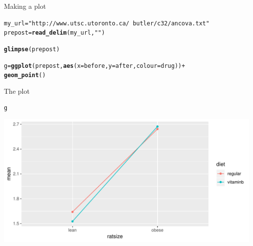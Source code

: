 \documentclass[unknownkeysallowed]{beamer}\usepackage[]{graphicx}\usepackage[]{color}
\makeatletter
\def\maxwidth{ %
  \ifdim\Gin@nat@width>\linewidth
    \linewidth
  \else
    \Gin@nat@width
  \fi
}
\newcommand{\hlstr}[1]{\textcolor[rgb]{0.192,0.494,0.8}{#1}}%
\newcommand{\hlopt}[1]{\textcolor[rgb]{0,0,0}{#1}}%
\newcommand{\hlstd}[1]{\textcolor[rgb]{0.345,0.345,0.345}{#1}}%
\newcommand{\hlkwb}[1]{\textcolor[rgb]{0.69,0.353,0.396}{#1}}%
\newcommand{\hlkwc}[1]{\textcolor[rgb]{0.333,0.667,0.333}{#1}}%
\newcommand{\hlkwd}[1]{\textcolor[rgb]{0.737,0.353,0.396}{\textbf{#1}}}%
\newenvironment{kframe}{%
 \def\at@end@of@kframe{}%
 \ifinner\ifhmode%
  \def\at@end@of@kframe{\end{minipage}}%
  \begin{minipage}{\columnwidth}%
 \fi\fi%
 \def\FrameCommand##1{\hskip\@totalleftmargin \hskip-\fboxsep
 \colorbox{shadecolor}{##1}\hskip-\fboxsep
     \hskip-\linewidth \hskip-\@totalleftmargin \hskip\columnwidth}%
 \MakeFramed {\advance\hsize-\width
   \@totalleftmargin\z@ \linewidth\hsize
   \@setminipage}}%
 {\par\unskip\endMakeFramed%
 \at@end@of@kframe}
\newenvironment{knitrout}{}{} %
\makeatother
\begin{document}
\begin{frame}[fragile]{Making a plot}

 
\begin{knitrout}\small
{}\color{fgcolor}\begin{kframe}
\begin{alltt}
\hlstd{my_url}\hlkwb{=}\hlstr{"http://www.utsc.utoronto.ca/~butler/c32/ancova.txt"}
\hlstd{prepost}\hlkwb{=}\hlkwd{read_delim}\hlstd{(my_url,}\hlstr{" "}\hlstd{)}
\end{alltt}


{\ttfamily\noindent\bfseries{}}\begin{alltt}
\hlkwd{glimpse}\hlstd{(prepost)}
\end{alltt}


{\ttfamily\noindent\bfseries\color{errorcolor}{\#\# Error in glimpse(prepost): object 'prepost' not found}}\begin{alltt}
\hlstd{g}\hlkwb{=}\hlkwd{ggplot}\hlstd{(prepost,}\hlkwd{aes}\hlstd{(}\hlkwc{x}\hlstd{=before,}\hlkwc{y}\hlstd{=after,}\hlkwc{colour}\hlstd{=drug))}\hlopt{+}
  \hlkwd{geom_point}\hlstd{()}
\end{alltt}


{\ttfamily\noindent\bfseries\color{errorcolor}{\#\# Error in ggplot(prepost, aes(x = before, y = after, colour = drug)): object 'prepost' not found}}\end{kframe}
\end{knitrout}
  
  
\end{frame}

\begin{frame}{The plot}

 
\begin{knitrout}
\color{fgcolor}\begin{kframe}
\begin{alltt}
\hlstd{g}
\end{alltt}
\end{kframe}
\includegraphics[width=\maxwidth]{figure/spizzo-1} 

\end{knitrout}
  
  
\end{frame}
\end{document}
